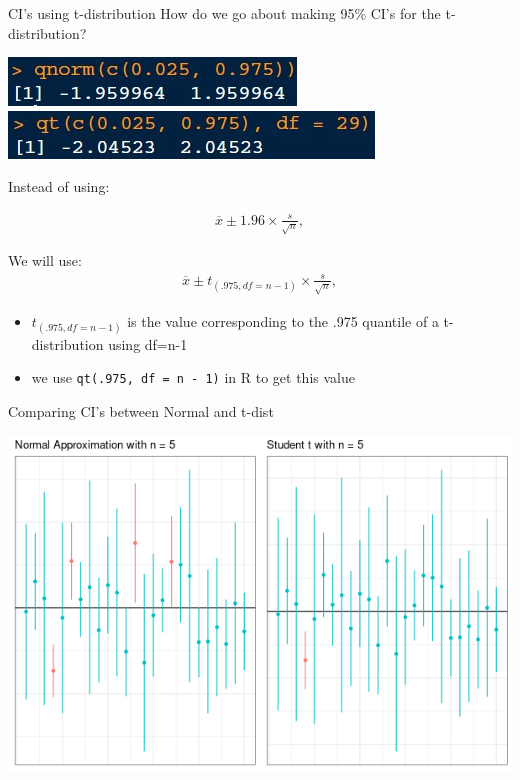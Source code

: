 \documentclass{beamer}
\begin{document}
\begin{frame}{CI's using t-distribution}
How do we go about making 95\% CI's for the t-distribution?
\begin{center}
\includegraphics[scale=.9]{img/qnorm1.jpg}
\includegraphics[scale=.9]{img/qnorm2.jpg}
\end{center}

Instead of using:

\begin{align*}
\overline{x} \pm 1.96 \times \frac{s}{\sqrt{n}},
\end{align*}

We will use:
\begin{align*}
\overline{x} \pm t_{(.975, df=n-1)} \times \frac{s}{\sqrt{n}},
\end{align*}
\begin{itemize}
    \item $t_{(.975, df=n-1)}$ is the value corresponding to the .975 quantile of a t-distribution using df=n-1
    \item we use \texttt{qt(.975, df = n - 1)} in R to get this value
\end{itemize}
\end{frame}

\begin{frame}{Comparing CI's between Normal and t-dist}
\begin{center}
\includegraphics[scale=0.5]{norm_vs_t.png}
\end{center}
\end{frame}
\end{document}

